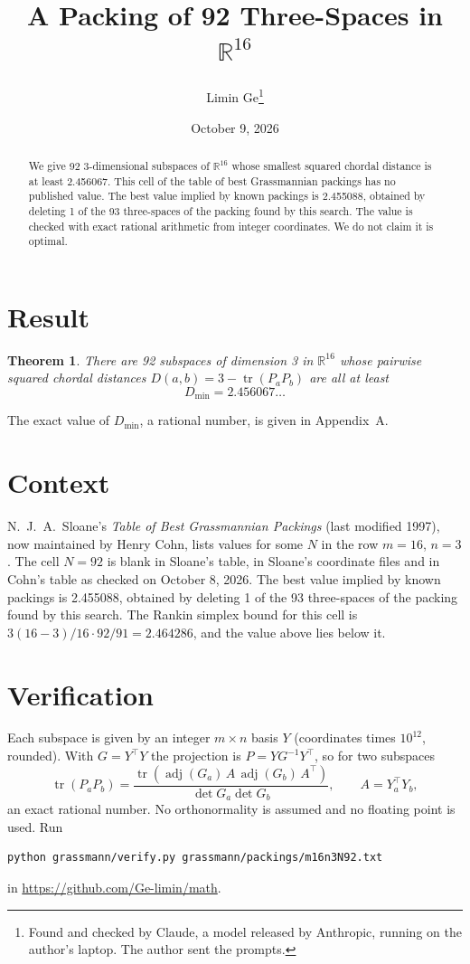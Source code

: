 \documentclass[11pt,a4paper]{article}
\title{A Packing of 92 Three-Spaces in $\mathbb{R}^{16}$}
\author{Limin Ge\thanks{Found and checked by Claude, a model released by Anthropic, running on the author's laptop. The author sent the prompts.}}
\date{October 9, 2026}
\newtheorem*{theorem}{Theorem}
\begin{document}
\maketitle
\begin{abstract}
We give 92 3-dimensional subspaces of $\mathbb{R}^{16}$ whose smallest squared chordal distance is at least 2.456067. This cell of the table of best Grassmannian packings has no published value. The best value implied by known packings is 2.455088, obtained by deleting 1 of the 93 three-spaces of the packing found by this search. The value is checked with exact rational arithmetic from integer coordinates. We do not claim it is optimal.
\end{abstract}

\section{Result}
\begin{theorem}
There are 92 subspaces of dimension 3 in $\mathbb{R}^{16}$ whose pairwise squared chordal distances $D(a,b) = 3 - \operatorname{tr}(P_aP_b)$ are all at least
\[ D_{\min} = 2.456067\ldots \]
\end{theorem}
The exact value of $D_{\min}$, a rational number, is given in Appendix~A.


\section{Context}
N.~J.~A.~Sloane's \emph{Table of Best Grassmannian Packings} (last modified 1997), now maintained by Henry Cohn, lists values for some $N$ in the row $m=16$, $n=3$. The cell $N=92$ is blank in Sloane's table, in Sloane's coordinate files and in Cohn's table as checked on October 8, 2026. The best value implied by known packings is 2.455088, obtained by deleting 1 of the 93 three-spaces of the packing found by this search. The Rankin simplex bound for this cell is $3(16-3)/16\cdot 92/91 = 2.464286$, and the value above lies below it.


\section{Verification}
Each subspace is given by an integer $m\times n$ basis $Y$ (coordinates times $10^{12}$, rounded). With $G=Y^\top Y$ the projection is $P=YG^{-1}Y^\top$, so for two subspaces
\[ \operatorname{tr}(P_aP_b)=\frac{\operatorname{tr}(\operatorname{adj}(G_a)\,A\,\operatorname{adj}(G_b)\,A^\top)}{\det G_a\det G_b},\qquad A=Y_a^\top Y_b, \]
an exact rational number. No orthonormality is assumed and no floating point is used. Run
\begin{verbatim}
python grassmann/verify.py grassmann/packings/m16n3N92.txt
\end{verbatim}
in \url{https://github.com/Ge-limin/math}.
\end{document}
